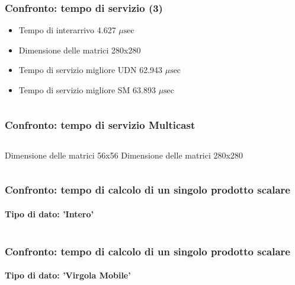 \documentclass{beamer}
\newcommand{\musec}{$\mu \textrm{sec}$}
\begin{document}
\begin{frame}
  \frametitle{Confronto: tempo di servizio (3)}
  \begin{itemize}
  \item Tempo di interarrivo 4.627 \musec %
  \item Dimensione delle matrici 280x280
  \item Tempo di servizio migliore UDN 62.943 \musec
  \item Tempo di servizio migliore SM 63.893 \musec  
  \end{itemize}
  \begin{columns}
    \resizebox{\columnwidth}{!}{}
    \resizebox{\columnwidth}{!}{}
  \end{columns}
\end{frame}

\begin{frame}
  \frametitle{Confronto: tempo di servizio Multicast}
  \begin{columns}
    Dimensione delle matrici 56x56
    Dimensione delle matrici 280x280
  \end{columns}
  \vspace{5mm}
  \begin{columns}[c]
    \resizebox{\columnwidth}{!}{}
    \resizebox{\columnwidth}{!}{}
  \end{columns}  
\end{frame}

\begin{frame}
  \frametitle{Confronto: tempo di calcolo di un singolo prodotto scalare}
  \framesubtitle{Tipo di dato: 'Intero'}
  \begin{columns}[c]
    \resizebox{\columnwidth}{!}{}
    \resizebox{\columnwidth}{!}{}
  \end{columns} 
\end{frame}

\begin{frame}
  \frametitle{Confronto: tempo di calcolo di un singolo prodotto scalare}
  \framesubtitle{Tipo di dato: 'Virgola Mobile'}
  \begin{columns}[c]
    \resizebox{\columnwidth}{!}{}
    \resizebox{\columnwidth}{!}{}
  \end{columns} 
\end{frame}
\end{document}
